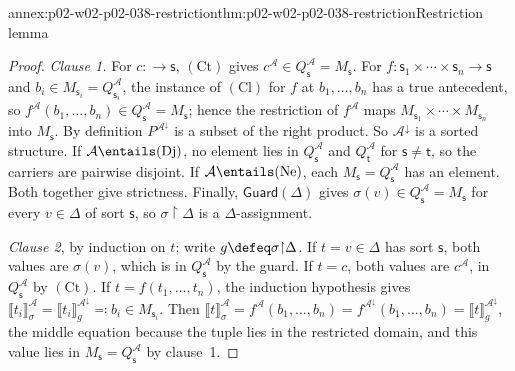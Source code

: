 \begin{annexitem}{annex:p02-w02-p02-038-restriction}{thm:p02-w02-p02-038-restriction}{Restriction lemma}
\begin{proof}
\emph{Clause 1.}  For \(c:\longrightarrow\mathsf s\), \((\mathrm{Ct})\) gives
\(c^{\mathcal A}\in Q_{\mathsf s}^{\mathcal A}=M_{\mathsf s}\).  For
\(f:\mathsf s_1\times\cdots\times\mathsf s_n\longrightarrow\mathsf s\) and
\(b_i\in M_{\mathsf s_i}=Q_{\mathsf s_i}^{\mathcal A}\), the instance of
\((\mathrm{Cl})\) for \(f\) at \(b_1,\ldots,b_n\) has a true antecedent, so
\(f^{\mathcal A}(b_1,\ldots,b_n)\in Q_{\mathsf s}^{\mathcal A}=M_{\mathsf s}\);
hence the restriction of \(f^{\mathcal A}\) maps
\(M_{\mathsf s_1}\times\cdots\times M_{\mathsf s_n}\) into \(M_{\mathsf s}\).
By definition \(P^{\mathcal A^{\downarrow}}\) is a subset of the right
product.  So \(\mathcal A^{\downarrow}\) is a sorted structure.  If
\(\mathcal A\entails(\mathrm{Dj})\), no element lies in
\(Q_{\mathsf s}^{\mathcal A}\) and \(Q_{\mathsf t}^{\mathcal A}\) for
\(\mathsf s\ne\mathsf t\), so the carriers are pairwise disjoint.  If
\(\mathcal A\entails(\mathrm{Ne})\), each
\(M_{\mathsf s}=Q_{\mathsf s}^{\mathcal A}\) has an element.  Both together
give strictness.  Finally, \(\mathsf{Guard}(\Delta)\) gives
\(\sigma(v)\in Q_{\mathsf s}^{\mathcal A}=M_{\mathsf s}\) for every
\(v\in\Delta\) of sort \(\mathsf s\), so \(\sigma{\restriction}\Delta\) is a
\(\Delta\)-assignment.

\emph{Clause 2}, by induction on \(t\); write \(g\defeq\sigma{\restriction}\Delta\).
If \(t=v\in\Delta\) has sort \(\mathsf s\), both values are \(\sigma(v)\),
which is in \(Q_{\mathsf s}^{\mathcal A}\) by the guard.  If \(t=c\), both
values are \(c^{\mathcal A}\), in \(Q_{\mathsf s}^{\mathcal A}\) by
\((\mathrm{Ct})\).  If \(t=f(t_1,\ldots,t_n)\), the induction hypothesis
gives
\(\llbracket t_i\rrbracket^{\mathcal A}_{\sigma}=
\llbracket t_i\rrbracket^{\mathcal A^{\downarrow}}_{g}\eqqcolon b_i\in
M_{\mathsf s_i}\).  Then
\(\llbracket t\rrbracket^{\mathcal A}_{\sigma}=f^{\mathcal A}(b_1,\ldots,b_n)
=f^{\mathcal A^{\downarrow}}(b_1,\ldots,b_n)=
\llbracket t\rrbracket^{\mathcal A^{\downarrow}}_{g}\), the middle equation
because the tuple lies in the restricted domain, and this value lies in
\(M_{\mathsf s}=Q_{\mathsf s}^{\mathcal A}\) by clause~1.


\end{proof}
\end{annexitem}

